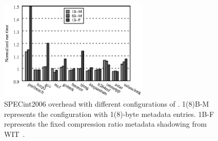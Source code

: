 \begin{figure}[t]
\center
  \includegraphics[width=2.8in]{plots/bargraph_runtime_spec.eps}
  \caption{
  SPECint2006 overhead with different configurations of \projectname{}. 1(8)B-M represents the configuration with
  1(8)-byte metadata entries. 1B-F represents the fixed compression ratio metadata shadowing from WIT~\cite{akritidis2008preventing}.
  }
  \label{fig:spec}
  \vspace{-1em}
\end{figure}
